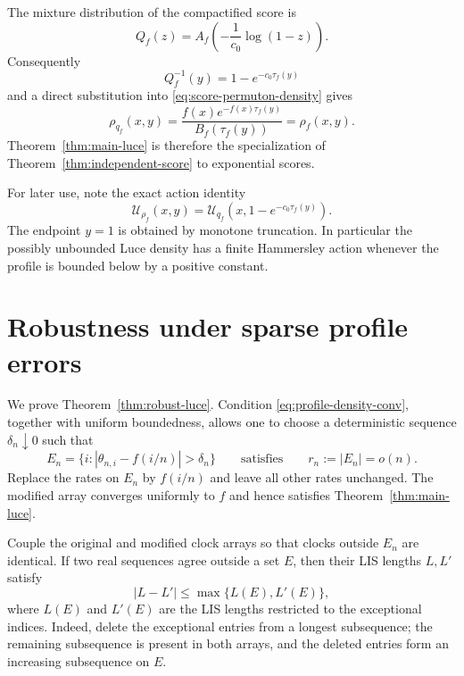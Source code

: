 \documentclass[11pt]{article}
\theoremstyle{remark}
\newcommand{\calU}{\mathcal U}
\begin{document}
The mixture distribution of the compactified score is
\begin{equation}\label{eq:luce-mixture-Q}
 Q_f(z)
 =A_f\left(-\frac1{c_0}\log(1-z)\right).
\end{equation}
Consequently
\[
 Q_f^{-1}(y)=1-e^{-c_0\tau_f(y)}
\]
and a direct substitution into \eqref{eq:score-permuton-density} gives
\[
 \rho_{q_f}(x,y)
 =\frac{f(x)e^{-f(x)\tau_f(y)}}{B_f(\tau_f(y))}
 =\rho_f(x,y).
\]
Theorem~\ref{thm:main-luce} is therefore the specialization of
Theorem~\ref{thm:independent-score} to exponential scores.

For later use, note the exact action identity
\begin{equation}\label{eq:luce-coordinate-invariance}
 \calU_{\rho_f}(x,y)
 =\calU_{q_f}\left(x,1-e^{-c_0\tau_f(y)}\right).
\end{equation}
The endpoint $y=1$ is obtained by monotone truncation.  In particular the
possibly unbounded Luce density has a finite Hammersley action whenever the
profile is bounded below by a positive constant.

\section{Robustness under sparse profile errors}

We prove Theorem~\ref{thm:robust-luce}.  Condition
\eqref{eq:profile-density-conv}, together with uniform boundedness, allows one
to choose a deterministic sequence $\delta_n\downarrow0$ such that
\begin{equation}\label{eq:exceptional-set-def}
 E_n=\{i:|\theta_{n,i}-f(i/n)|>\delta_n\}
 \qquad\text{satisfies}\qquad
 r_n:=|E_n|=o(n).
\end{equation}
Replace the rates on $E_n$ by $f(i/n)$ and leave all other rates unchanged.
The modified array converges uniformly to $f$ and hence satisfies
Theorem~\ref{thm:main-luce}.

Couple the original and modified clock arrays so that clocks outside $E_n$ are
identical.  If two real sequences agree outside a set $E$, then their LIS
lengths $L,L'$ satisfy
\begin{equation}\label{eq:sparse-replacement-lis}
        |L-L'|\le\max\{L(E),L'(E)\},
\end{equation}
where $L(E)$ and $L'(E)$ are the LIS lengths restricted to the exceptional
indices.  Indeed, delete the exceptional entries from a longest subsequence;
the remaining subsequence is present in both arrays, and the deleted entries
form an increasing subsequence on $E$.
\end{document}
